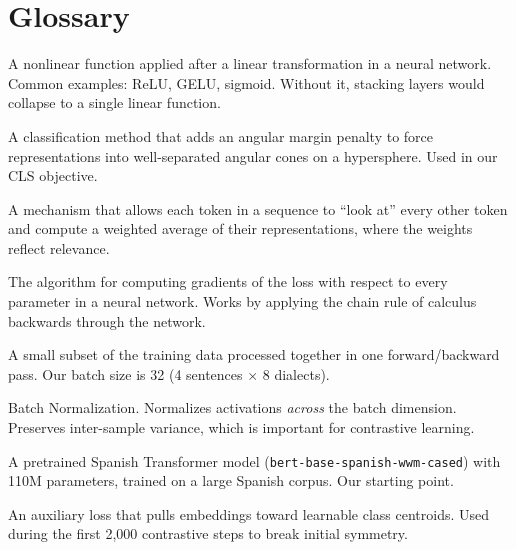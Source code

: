 \documentclass[11pt,a4paper]{article}
\theoremstyle{definition}
\begin{document}
\newpage
\part*{Glossary}

\begin{description}[style=nextline, leftmargin=3.5cm, font=\bfseries]

  \item[Activation function]
    A nonlinear function applied after a linear transformation in a
    neural network. Common examples: ReLU, GELU, sigmoid. Without it,
    stacking layers would collapse to a single linear function.

  \item[ArcFace]
    A classification method that adds an angular margin penalty to
    force representations into well-separated angular cones on a
    hypersphere. Used in our CLS objective.

  \item[Attention]
    A mechanism that allows each token in a sequence to ``look at''
    every other token and compute a weighted average of their
    representations, where the weights reflect relevance.

  \item[Backpropagation]
    The algorithm for computing gradients of the loss with respect to
    every parameter in a neural network. Works by applying the chain
    rule of calculus backwards through the network.

  \item[Batch]
    A small subset of the training data processed together in one
    forward/backward pass. Our batch size is 32 (4 sentences
    $\times$ 8 dialects).

  \item[BatchNorm]
    Batch Normalization. Normalizes activations \emph{across} the
    batch dimension. Preserves inter-sample variance, which is
    important for contrastive learning.

  \item[BETO]
    A pretrained Spanish Transformer model
    (\texttt{bert-base-spanish-wwm-cased}) with 110M parameters,
    trained on a large Spanish corpus. Our starting point.

  \item[Center loss]
    An auxiliary loss that pulls embeddings toward learnable class
    centroids. Used during the first 2,000 contrastive steps to break
    initial symmetry.


\end{description}
\end{document}

